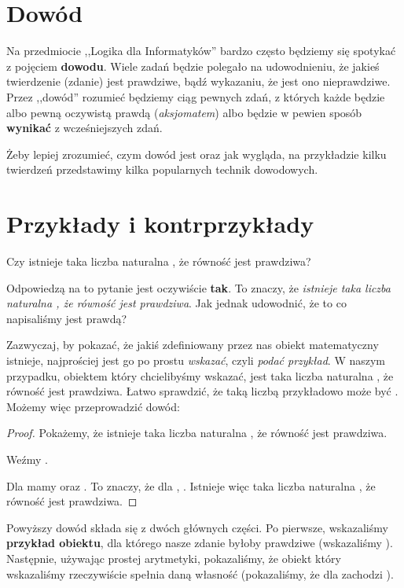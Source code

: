 \section{Dowód}
Na przedmiocie ,,Logika dla Informatyków'' bardzo często będziemy się spotykać z pojęciem \textbf{dowodu}. Wiele zadań będzie polegało na udowodnieniu, że jakieś twierdzenie (zdanie) jest prawdziwe, bądź wykazaniu, że jest ono nieprawdziwe. Przez ,,dowód'' rozumieć będziemy ciąg pewnych zdań, z których każde będzie albo pewną oczywistą prawdą (\textit{aksjomatem}) albo będzie w pewien sposób \textbf{wynikać} z wcześniejszych zdań.

Żeby lepiej zrozumieć, czym dowód jest oraz jak wygląda, na przykładzie kilku twierdzeń przedstawimy kilka popularnych technik dowodowych.

\section{Przykłady i kontrprzykłady}
\begin{example}
Czy istnieje taka liczba naturalna , że równość  jest prawdziwa?

Odpowiedzą na to pytanie jest oczywiście \textbf{tak}. To znaczy, że \textit{istnieje taka liczba naturalna , że równość  jest prawdziwa}. Jak jednak udowodnić, że to co napisaliśmy jest prawdą?

Zazwyczaj, by pokazać, że jakiś zdefiniowany przez nas obiekt matematyczny istnieje, najprościej jest go po prostu \textit{wskazać}, czyli \textit{podać przykład}. W naszym przypadku, obiektem który chcielibyśmy wskazać, jest taka liczba naturalna , że równość  jest prawdziwa. Łatwo sprawdzić, że taką liczbą przykładowo może być . Możemy więc przeprowadzić dowód:

\begin{proof}
Pokażemy, że istnieje taka liczba naturalna , że równość  jest prawdziwa.

Weźmy . 

Dla  mamy  oraz . To znaczy, że dla , . Istnieje więc taka liczba naturalna , że równość  jest prawdziwa.
\end{proof}

Powyższy dowód składa się z dwóch głównych części. Po pierwsze, wskazaliśmy \textbf{przykład obiektu}, dla którego nasze zdanie byłoby prawdziwe (wskazaliśmy ). Następnie, używając prostej arytmetyki, pokazaliśmy, że obiekt który wskazaliśmy rzeczywiście spełnia daną własność (pokazaliśmy, że dla  zachodzi ).
\end{example}

